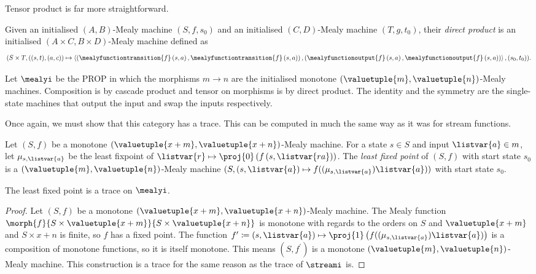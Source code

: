 Tensor product is far more straightforward.

\begin{definition}
    Given an initialised \((A,B)\)-Mealy machine \((S,f,s_0)\) and an
    initialised \((C,D)\)-Mealy machine \((T,g,t_0)\), their
    \emph{direct product} is an initialised \((A \times C,B \times D)\)-Mealy
    machine defined as \[
        (S \times T, \left((s, t), (a, c)\right) \mapsto \left\langle
        \left(
        \mealyfunctiontransition{f}\left(s, a\right),
        \mealyfunctiontransition{f}\left(s, a\right)
        \right),
        \left(
        \mealyfunctionoutput{f}\left(s, a\right),
        \mealyfunctionoutput{f}\left(s, a\right)
        \right)\right\rangle,
        (s_0, t_0)
        ).
    \]
\end{definition}

\begin{definition}
    Let \(\mealyi\) be the PROP in which the morphisms
    \(m \to n\) are the initialised monotone
    \((\valuetuple{m}, \valuetuple{n})\)-Mealy machines.
    Composition is by cascade product and tensor on morphisms is by
    direct product.
    The identity and the symmetry are the single-state machines that output the
    input and swap the inputs respectively.
\end{definition}

Once again, we must show that this category has a trace.
This can be computed in much the same way as it was for stream functions.

\begin{definition}
    Let \((S, f)\) be a monotone \(
    (\valuetuple{x+m}, \valuetuple{x+n})
    \)-Mealy machine.
    For a state \(s \in S\) and input \(\listvar{a} \in m\), let
    \(\mu_{s,\listvar{a}}\) be the least fixpoint of \(
    \listvar{r} \mapsto \proj{0}\left(f\left(s, \listvar{ra}\right)\right)
    \).
    The \emph{least fixed point} of \((S, f)\) with start state \(s_0\) is a \(
    (\valuetuple{m}, \valuetuple{n})
    \)-Mealy machine \(
    (S, (s, \listvar{a}) \mapsto f((\mu_{s,\listvar{a}})\listvar{a}))
    \) with start state \(s_0\).
\end{definition}

\begin{proposition}
    The least fixed point is a trace on \(\mealyi\).
\end{proposition}
\begin{proof}
    Let \((S, f)\) be a monotone
    \((\valuetuple{x+m}, \valuetuple{x+n})\)-Mealy machine.
    The Mealy function \(
    \morph{f}{
        S \times \valuetuple{x+m}
    }{
        S \times \valuetuple{x+n}
    }
    \) is monotone with regards to the orders on \(S\) and
    \(\valuetuple{x+m}\) and \(S \times x+n\) is finite, so
    \(f\) has a fixed point.
    The function \(
    f^\prime \coloneqq (s, \listvar{a})
    \mapsto
    \proj{1}\left(f((\mu_{s,\listvar{a}})\listvar{a})\right)
    \) is a composition of monotone functions, so it is itself monotone.
    This means \((S, f^\prime)\) is a monotone \(
    (\valuetuple{m}, \valuetuple{n})
    \)-Mealy machine.
    This construction is a trace for the same reason as the trace of
    \(\streami\) is.
\end{proof}

